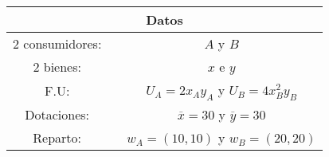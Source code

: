 \vspace{-0.3cm}
\begin{center}
	\begingroup
		\setlength{\tabcolsep}{10pt} %
		\renewcommand{\arraystretch}{1.5} %
			\begin{tabular}{ccc}
					\hline
				\multicolumn{3}{c}{Datos} \\
					\hline
				2 consumidores: & {} & $A$ y $B$ \\
				2 bienes: & {} &$x$ e $y$ \\
				F.U: & {} &$U_{A} = 2x_{A}y_{A}$ y $U_{B} = 4x_{B}^{2}y_{B}$ \\
				Dotaciones: & {} &$\overline{x} = 30$ y $\overline{y} = 30$ \\
				Reparto: & {} &$w_{A} = (10, 10)$ y $w_{B}=(20,20)$\\
					\hline
			\end{tabular}
	\endgroup
\end{center}

